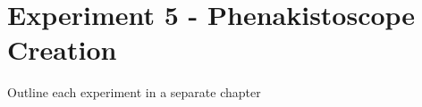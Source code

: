 \chapter*{Experiment 5 - Phenakistoscope Creation}

Outline each experiment in a separate chapter

\citep{kalif-15-a} \citep{kalif-15-b} \cite{pepi-11}